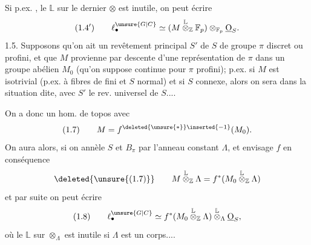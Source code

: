 Si p.ex.  , le $\mathbb L$ sur le dernier $\otimes$ est inutile, on peut écrire
\[
(1.4')\qquad \ell^{\unsure{G|C}}_{\bullet}\simeq (M\overset{\mathbb L}{\otimes}_{\mathbb Z}\mathbb F_p)\otimes_{\mathbb F_p}\underline{\mathrm O}_S.
\]
1.5.  Supposons qu'on ait un revêtement  principal $S'$ de $S$ de groupe  $\pi$ discret ou profini, et que $M$ provienne par descente d'une  représentation de $\pi$ dans un groupe abélien $M_0$ (qu'on suppose continue pour $\pi$ profini); p.ex. si $M$ est isotrivial (p.ex. à fibres de  fini et $S$  normal) et si $S$ connexe, alors on sera dans la situation dite, avec $S'$ le rev. universel de $S$....

On a donc un hom. de topos
avec
\[
(1.7)\qquad M=f^{\deleted{\unsure{*}}\inserted{-1}}(M_0).
\]
On aura alors, si on annèle $S$ et $B_\pi$ par l'anneau constant $\Lambda$, et envisage $f$ en conséquence
\[
\deleted{\unsure{(1.7)}}\qquad M\overset{\mathbb L}{\otimes}_{\mathbb Z}\Lambda=f^*(M_0\overset{\mathbb L}{\otimes}_{\mathbb Z}\Lambda)
\]
et par suite on peut écrire
\[
(1.8)\qquad \ell^{\unsure{G|C}}_{\bullet}\simeq f^*(M_0\overset{\mathbb L}{\otimes}_{\mathbb Z}\Lambda)\overset{\mathbb L}{\otimes}_{\Lambda}\underline{\mathrm O}_S,
\]
où le $\mathbb L$ sur $\otimes_\Lambda$ est inutile si $\Lambda$ est un corps....

